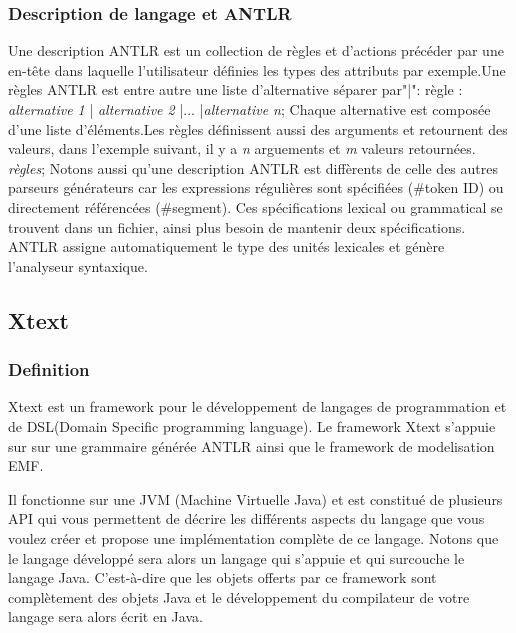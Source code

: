 \documentclass{article}
\begin{document}
{\subsubsection{Description de langage et ANTLR}
Une description ANTLR est un collection de règles et d'actions précéder par une en-tête dans laquelle l'utilisateur définies les types des attributs par exemple.\newline Une règles ANTLR est entre autre une liste d'alternative séparer par"|":\newline
règle : \textit{alternative \textsl{1}} | \textit{alternative \textsl{2}} |... |\textit{alternative \textsl{n}};\newline
Chaque alternative est composée d'une liste d'éléments.Les règles définissent aussi des arguments et retournent des valeurs, dans l'exemple suivant, il y a \textsl{n} arguements et \textsl{m} valeurs retournées.
\textit{règles}\succ{};\newline 
Notons aussi qu'une description ANTLR est diffèrents de celle des autres parseurs générateurs car les expressions régulières sont spécifiées \left(\#token ID\right) ou directement référencées \left(\#segment\right). Ces spécifications lexical ou grammatical se trouvent dans un fichier, ainsi plus besoin de mantenir deux spécifications. ANTLR assigne automatiquement le type des unités lexicales et génère l'analyseur syntaxique.

\subsection{Xtext}
\subsubsection{Definition}
Xtext est un framework pour le développement de langages de programmation et de DSL(Domain Specific programming language).
Le framework Xtext s’appuie sur sur une grammaire générée ANTLR ainsi que le framework de modelisation EMF.

Il fonctionne sur une JVM (Machine Virtuelle Java) et est constitué de plusieurs API qui vous permettent de décrire les différents aspects du langage que vous voulez créer et propose une implémentation complète de ce langage. Notons que le langage développé sera alors un langage qui s'appuie et qui surcouche le langage Java. C'est-à-dire que les objets offerts par ce framework sont complètement des objets Java et le développement du compilateur de votre langage sera alors écrit en Java.

}
\end{document}
